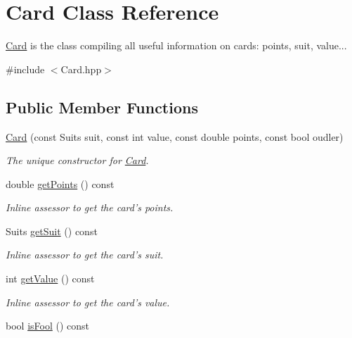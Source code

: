 \hypertarget{classCard}{\section{\-Card \-Class \-Reference}
\label{classCard}
}


\hyperlink{classCard}{\-Card} is the class compiling all useful information on cards\-: points, suit, value...  




{\ttfamily \#include $<$\-Card.\-hpp$>$}

\subsection*{\-Public \-Member \-Functions}
\begin{DoxyCompactItemize}
\item 
\hyperlink{classCard_a113a46b46e64efe0fd98a42df301db9a}{\-Card} (const \-Suits suit, const int value, const double points, const bool oudler)
\begin{DoxyCompactList}\small\item\em \-The unique constructor for \hyperlink{classCard}{\-Card}. \end{DoxyCompactList}\item 
\hypertarget{classCard_adf11e6396788e2e832d3bdf29880593f}{double \hyperlink{classCard_adf11e6396788e2e832d3bdf29880593f}{get\-Points} () const }\label{classCard_adf11e6396788e2e832d3bdf29880593f}

\begin{DoxyCompactList}\small\item\em \-Inline assessor to get the card's points. \end{DoxyCompactList}\item 
\hypertarget{classCard_a77f39ecaee335e62e267e44e07a15ebe}{\-Suits \hyperlink{classCard_a77f39ecaee335e62e267e44e07a15ebe}{get\-Suit} () const }\label{classCard_a77f39ecaee335e62e267e44e07a15ebe}

\begin{DoxyCompactList}\small\item\em \-Inline assessor to get the card's suit. \end{DoxyCompactList}\item 
\hypertarget{classCard_ab70c98dd7bfc44f87c5914990737e79d}{int \hyperlink{classCard_ab70c98dd7bfc44f87c5914990737e79d}{get\-Value} () const }\label{classCard_ab70c98dd7bfc44f87c5914990737e79d}

\begin{DoxyCompactList}\small\item\em \-Inline assessor to get the card's value. \end{DoxyCompactList}\item 
\hypertarget{classCard_aa05732992ee8352a205a15d89f4edda4}{bool \hyperlink{classCard_aa05732992ee8352a205a15d89f4edda4}{is\-Fool} () const }\label{classCard_aa05732992ee8352a205a15d89f4edda4}


\end{DoxyCompactItemize}
